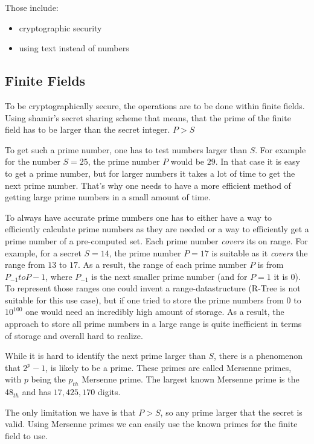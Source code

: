 Those include:

\begin{itemize}
  \item cryptographic security
  \item using text instead of numbers
\end{itemize}

\subsection{Finite Fields}

To be cryptographically secure, the operations are to be done within finite
fields. Using shamir's secret sharing scheme that means, that the prime of the
finite field has to be larger than the secret integer. $P > S$

To get such a prime number, one has to test numbers larger than $S$. For example
for the number $S = 25$, the prime number $P$ would be $29$. In that case it is
easy to get a prime number, but for larger numbers it takes a lot of time to get
the next prime number. That's why one needs to have a more efficient method of
getting large prime numbers in a small amount of time.

To always have accurate prime numbers one has to either have a way to efficiently
calculate prime numbers as they are needed or a way to efficiently get a prime
number of a pre-computed set. Each prime number \textit{covers} its on range. For
example, for a secret $S = 14$, the prime number $P = 17$ is suitable as it
\textit{covers} the range from $13$ to $17$. As a result, the range of each
prime number $P$ is from $P_{-1} to P-1$, where $P_{-1}$ is the next smaller
prime number (and for $P = 1$ it is $0$). To represent those ranges one could
invent a range-datastructure (R-Tree is not suitable for this use case), but
if one tried to store the prime numbers from $0$ to $10^{100}$ one would need
an incredibly high amount of storage. As a result, the approach to store all
prime numbers in a large range is quite inefficient in terms of storage and
overall hard to realize.

While it is hard to identify the next prime larger than $S$, there is
a phenomenon that $2^p-1$, is likely to be a prime. These primes are called
Mersenne primes, with $p$ being the $p_{th}$ Mersenne prime. The largest known
Mersenne prime is the 48$_{th}$ and has $17,425,170$ digits.

The only limitation we have is that $P > S$, so any prime larger that the
secret is valid. Using Mersenne primes we can easily use the known primes for
the finite field to use.

